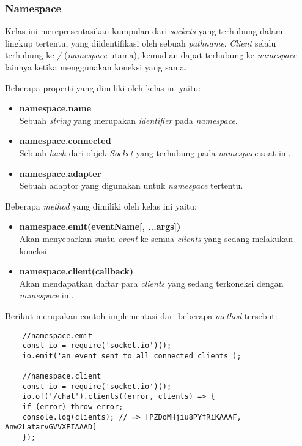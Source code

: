 \subsubsection{Namespace}
Kelas ini merepresentasikan kumpulan dari \textit{sockets} yang terhubung dalam lingkup tertentu, yang diidentifikasi oleh sebuah \textit{pathname}. \textit{Client} selalu terhubung ke \textit{/} (\textit{namespace} utama), kemudian dapat terhubung ke \textit{namespace} lainnya ketika menggunakan koneksi yang sama.

Beberapa properti yang dimiliki oleh kelas ini yaitu: 
\begin{itemize}
	\item \textbf{namespace.name} \\ Sebuah \textit{string} yang merupakan \textit{identifier} pada \textit{namespace}.
	\item \textbf{namespace.connected} \\ Sebuah \textit{hash} dari objek \textit{Socket} yang terhubung pada \textit{namespace} saat ini.
	\item \textbf{namespace.adapter} \\ Sebuah adaptor yang digunakan untuk \textit{namespace} tertentu.
\end{itemize}

Beberapa \textit{method} yang dimiliki oleh kelas ini yaitu:

\begin{itemize}
	\item \textbf{namespace.emit(eventName[, ...args])} \\ Akan menyebarkan suatu \textit{event} ke semua \textit{clients} yang sedang melakukan koneksi.
	
	\item \textbf{namespace.client(callback)} \\ Akan mendapatkan daftar para \textit{clients} yang sedang terkoneksi dengan \textit{namespace} ini.
\end{itemize}

Berikut merupakan contoh implementasi dari beberapa \textit{method} tersebut:

\begin{lstlisting}
	//namespace.emit
	const io = require('socket.io')();
	io.emit('an event sent to all connected clients');
	
	//namespace.client
	const io = require('socket.io')();
	io.of('/chat').clients((error, clients) => {
	if (error) throw error;
	console.log(clients); // => [PZDoMHjiu8PYfRiKAAAF, Anw2LatarvGVVXEIAAAD]
	});
\end{lstlisting}

